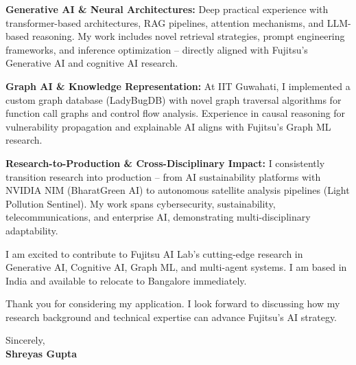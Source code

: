 \documentclass[11pt,letterpaper]{article}
\begin{document}
\vspace{4pt}

\noindent \textbf{Generative AI \& Neural Architectures:} Deep practical experience with transformer-based architectures, RAG pipelines, attention mechanisms, and LLM-based reasoning. My work includes novel retrieval strategies, prompt engineering frameworks, and inference optimization -- directly aligned with Fujitsu's Generative AI and cognitive AI research.

\vspace{4pt}

\noindent \textbf{Graph AI \& Knowledge Representation:} At IIT Guwahati, I implemented a custom graph database (LadyBugDB) with novel graph traversal algorithms for function call graphs and control flow analysis. Experience in causal reasoning for vulnerability propagation and explainable AI aligns with Fujitsu's Graph ML research.

\vspace{4pt}

\noindent \textbf{Research-to-Production \& Cross-Disciplinary Impact:} I consistently transition research into production -- from AI sustainability platforms with NVIDIA NIM (BharatGreen AI) to autonomous satellite analysis pipelines (Light Pollution Sentinel). My work spans cybersecurity, sustainability, telecommunications, and enterprise AI, demonstrating multi-disciplinary adaptability.

\vspace{4pt}

\noindent I am excited to contribute to Fujitsu AI Lab's cutting-edge research in Generative AI, Cognitive AI, Graph ML, and multi-agent systems. I am based in India and available to relocate to Bangalore immediately.

\vspace{4pt}

\noindent Thank you for considering my application. I look forward to discussing how my research background and technical expertise can advance Fujitsu's AI strategy.

\vspace{12pt}

\noindent Sincerely, \\
\vspace{4pt}
\noindent \textbf{Shreyas Gupta}
\end{document}
